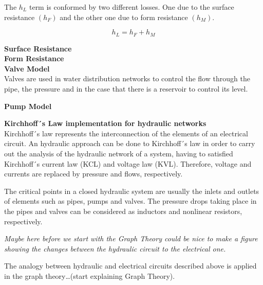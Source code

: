 %
%
%

The $h_L$ term is conformed by two different losses. One due to the surface resistance $(h_F)$ and the other one due to form resistance $(h_M)$. 

\begin{equation}
  h_L = h_F + h_M
\end{equation}

\textbf{Surface Resistance} \\ 

\textbf{Form Resistance} \\ 

\textbf{Valve Model}  \\
\label{ValveModel}
 Valves are used in water distribution networks to control the flow through the pipe, the pressure and in 
 the case that there is a reservoir to control its level. 
 
 \textbf{Pump Model} \\
 \label{PumpModel}
 
 \textbf{Kirchhoff´s Law implementation for hydraulic networks}\\
 \label{KirchhoffLaw}
 Kirchhoff´s law represents the interconnection of the elements of an electrical circuit. An hydraulic approach 
 can be done to Kirchhoff´s law in order to carry out the analysis of the hydraulic network of a system, having to satisfied Kirchhoff´s 
 current law (KCL) and voltage law (KVL). Therefore, voltage and currents are replaced by pressure and flows, respectively. 

The critical points in a closed hydraulic system are usually the inlets and outlets of elements such as pipes, pumps and valves. 
The pressure drops taking place in the pipes and valves can be considered as inductors and nonlinear resistors, respectively. 

\textit{Maybe here before we start with the Graph Theory could be nice to make a figure showing the changes between the hydraulic circuit to the electrical 
one.}

The analogy between hydraulic and electrical circuits described above is applied in the graph theory…(start explaining Graph Theory).






